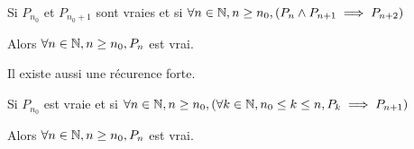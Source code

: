 \documentclass[a4paper, 12pt]{article}
\begin{document}
\begin{methode}
    Si $P_{n_0}$ et $P_{n_0+1}$ sont vraies et si $\forall n \in \mathbb{N}, n \geq n_0, (P_n \land P_{n+1} \implies P_{n+2})$
    
    Alors $\forall n \in \mathbb{N}, n \geq n_0, P_n$ est vrai.
\end{methode}

Il existe aussi une récurence forte.

\begin{methode}
    Si $P_{n_0}$ est vraie et si $\forall n \in \mathbb{N}, n \geq n_0, (\forall k \in \mathbb{N}, n_0 \leq k \leq n, P_k \implies P_{n+1})$
    
    Alors $\forall n \in \mathbb{N}, n \geq n_0, P_n$ est vrai.
\end{methode}
\end{document}
